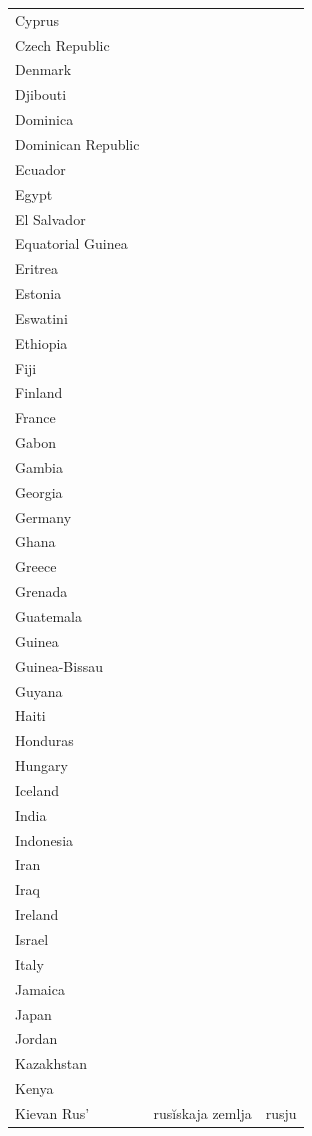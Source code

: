 \documentclass{clgrammar}
\begin{document}
\begin{longtable}{lll}
	Cyprus &  &  \\
	Czech Republic &  &  \\
	Denmark &  &  \\
	Djibouti &  &  \\
	Dominica &  &  \\
	Dominican Republic &  &  \\
	Ecuador &  &  \\
	Egypt &  &  \\
	El Salvador &  &  \\
	Equatorial Guinea &  &  \\
	Eritrea &  &  \\
	Estonia &  &  \\
	Eswatini &  &  \\
	Ethiopia &  &  \\
	Fiji &  &  \\
	Finland &  &  \\
	France &  &  \\
	Gabon &  &  \\
	Gambia &  &  \\
	Georgia &  &  \\
	Germany &  &  \\
	Ghana &  &  \\
	Greece &  &  \\
	Grenada &  &  \\
	Guatemala &  &  \\
	Guinea &  &  \\
	Guinea-Bissau &  &  \\
	Guyana &  &  \\
	Haiti &  &  \\
	Honduras &  &  \\
	Hungary &  &  \\
	Iceland &  &  \\
	India &  &  \\
	Indonesia &  &  \\
	Iran &  &  \\
	Iraq &  &  \\
	Ireland &  &  \\
	Israel &  &  \\
	Italy &  &  \\
	Jamaica &  &  \\
	Japan &  &  \\
	Jordan &  &  \\
	Kazakhstan &  &  \\
	Kenya &  &  \\
	Kievan Rus' & rusĭskaja zemlja & rusju \\

\end{longtable}
\end{document}

